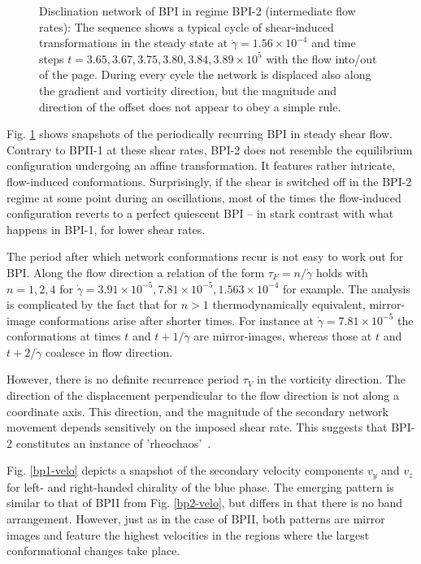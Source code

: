 \documentclass[aps,pre,reprint,superscriptaddress, twocolumn]{revtex4}
\newcommand{\e}[1]{\times10^{#1}}
\newcommand{\gd}{\dot{\gamma}}
\begin{document}
\begin{figure}[htpb]
\caption{Disclination network of BPI in regime BPI-2 (intermediate flow rates): 
The sequence shows a typical cycle of shear-induced transformations in the 
steady state at $\gd=1.56\e{-4}$ and time steps 
$t=3.65, 3.67,3.75,3.80,3.84,3.89\e{5}$ with the flow into/out of the page. 
During every cycle the network is displaced also along the gradient and vorticity direction, 
but the magnitude and direction of the offset does not appear to obey a 
simple rule.}
\label{bp1-med}
\end{figure}


Fig. \ref{bp1-med} shows snapshots of the periodically recurring 
BPI in steady shear flow. Contrary to BPII-1 at these shear rates, 
BPI-2 does not resemble the equilibrium configuration
undergoing an affine transformation. It features rather intricate, flow-induced 
conformations. Surprisingly, if the shear is switched off in
the BPI-2 regime at some point during an oscillations, 
most of the times the flow-induced configuration 
reverts to a perfect quiescent BPI -- in stark contrast with
what happens in BPI-1, for lower shear rates. 

The period after which network conformations recur is not
easy to work out for BPI. Along the flow direction a relation of the form
$\tau_F=n/\gd$ holds with $n=1,2,4$ for $\gd=3.91\e{-5},
7.81\e{-5},1.563\e{-4}$ for example. The analysis is complicated by the fact
that for $n>1$ thermodynamically equivalent, mirror-image 
conformations arise after shorter times. For instance at $\gd=7.81\e{-5}$
the conformations at times $t$ and $t+1/\gd$ are mirror-images, whereas
those at $t$ and $t+2/\gd$ coalesce in flow direction.

However, there is no definite recurrence period $\tau_V$ 
in the vorticity direction. The direction of the displacement
perpendicular to the flow direction is not along a coordinate
axis. This direction, and the magnitude of the secondary
network movement depends sensitively on the imposed shear rate. 
This suggests that BPI-2 constitutes an instance of 
'rheochaos'~\cite{rheochaos}.

Fig. \ref{bp1-velo} depicts a snapshot of the secondary velocity 
components $v_y$ and $v_z$ for left- and right-handed chirality of
the blue phase. The emerging pattern is similar to that of BPII from 
Fig. \ref{bp2-velo}, but differs in that there is no band
arrangement. However, just as in the case of BPII, both patterns
are mirror images and feature the highest velocities in the regions where 
the largest conformational changes take place. 
\end{document}
